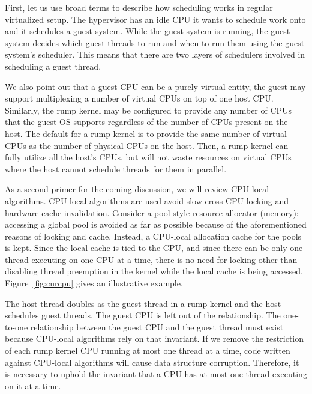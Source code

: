 First, let us use broad terms to describe how scheduling works in regular
virtualized setup.  The hypervisor has an idle CPU it wants to schedule
work onto and it schedules a guest system.  While the guest system is
running, the guest system decides which guest threads to run and when
to run them using the guest system's scheduler.  This means that there
are two layers of schedulers involved in scheduling a guest thread.

We also point out that a guest CPU can be a purely virtual entity, \eg
the guest may support multiplexing a number of virtual CPUs on top of
one host CPU.  Similarly, the rump kernel may be configured to provide
any number of CPUs that the guest OS supports regardless of the number of
CPUs present on the host.  The default for a rump kernel is to provide the
same number of virtual CPUs as the number of physical CPUs on the host.
Then, a rump kernel can fully utilize all the host's CPUs, but will not
waste resources on virtual CPUs where the host cannot schedule threads
for them in parallel.

As a second primer for the coming discussion, we will review
CPU-local algorithms.  CPU-local algorithms are used avoid slow
cross-CPU locking and hardware cache invalidation.  Consider a
pool-style resource allocator (\eg memory): accessing a global pool
is avoided as far as possible because of the aforementioned reasons
of locking and cache.  Instead, a CPU-local allocation cache for
the pools is kept.  Since the local cache is tied to the CPU, and since
there can be only one thread executing on one CPU at a time, there is
no need for locking other than disabling thread preemption in the kernel
while the local cache is being accessed.  Figure~\ref{fig:curcpu}
gives an illustrative example.

The host thread doubles as the guest thread in a rump kernel and the host
schedules guest threads.  The guest CPU is left out of the relationship.
The one-to-one relationship between the guest CPU and the guest thread
must exist because CPU-local algorithms rely on that invariant.  If we
remove the restriction of each rump kernel CPU running at most one thread
at a time, code written against CPU-local algorithms will cause data
structure corruption.  Therefore, it is necessary to uphold
the invariant that a CPU has at most one thread executing on it at a time.

